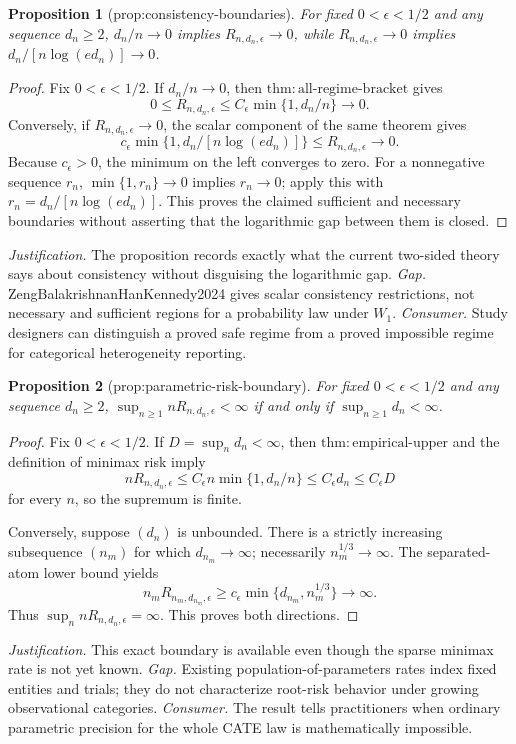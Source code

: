 \documentclass{article}
\newtheorem{proposition}{Proposition}
\begin{document}
\begin{proposition}[prop:consistency-boundaries]\label{prop:consistency-boundaries}
For fixed \(0<\epsilon<1/2\) and any sequence \(d_n\ge2\), \(d_n/n\to0\) implies \(R_{n,d_n,\epsilon}\to0\), while \(R_{n,d_n,\epsilon}\to0\) implies \(d_n/[n\log(ed_n)]\to0\).
\end{proposition}
\begin{proof}
Fix \(0<\epsilon<1/2\).  If \(d_n/n\to0\), then \(\mathrm{thm:all\mbox{-}regime\mbox{-}bracket}\) gives
\[
0\leq R_{n,d_n,\epsilon}\leq C_\epsilon\min\{1,d_n/n\}\longrightarrow0.
\]
Conversely, if \(R_{n,d_n,\epsilon}\to0\), the scalar component of the same theorem gives
\[
c_\epsilon\min\{1,d_n/[n\log(ed_n)]\}
\leq R_{n,d_n,\epsilon}\longrightarrow0.
\]
Because \(c_\epsilon>0\), the minimum on the left converges to zero.  For a nonnegative sequence \(r_n\), \(\min\{1,r_n\}\to0\) implies \(r_n\to0\); apply this with \(r_n=d_n/[n\log(ed_n)]\).  This proves the claimed sufficient and necessary boundaries without asserting that the logarithmic gap between them is closed.
\end{proof}
\par\smallskip\noindent \textit{Justification.} The proposition records exactly what the current two-sided theory says about consistency without disguising the logarithmic gap. \textit{Gap.} ZengBalakrishnanHanKennedy2024 gives scalar consistency restrictions, not necessary and sufficient regions for a probability law under \(W_1\). \textit{Consumer.} Study designers can distinguish a proved safe regime from a proved impossible regime for categorical heterogeneity reporting.

\begin{proposition}[prop:parametric-risk-boundary]\label{prop:parametric-risk-boundary}
For fixed \(0<\epsilon<1/2\) and any sequence \(d_n\ge2\), \(\sup_{n\ge1}nR_{n,d_n,\epsilon}<\infty\) if and only if \(\sup_{n\ge1}d_n<\infty\).
\end{proposition}
\begin{proof}
Fix \(0<\epsilon<1/2\).  If \(D=\sup_nd_n<\infty\), then \(\mathrm{thm:empirical\mbox{-}upper}\) and the definition of minimax risk imply
\[
nR_{n,d_n,\epsilon}\leq C_\epsilon n\min\{1,d_n/n\}
\leq C_\epsilon d_n\leq C_\epsilon D
\]
for every \(n\), so the supremum is finite.

Conversely, suppose \((d_n)\) is unbounded.  There is a strictly increasing subsequence \((n_m)\) for which \(d_{n_m}\to\infty\); necessarily \(n_m^{1/3}\to\infty\).  The separated-atom lower bound yields
\[
n_mR_{n_m,d_{n_m},\epsilon}
\geq c_\epsilon\min\{d_{n_m},n_m^{1/3}\}\longrightarrow\infty.
\]
Thus \(\sup_n nR_{n,d_n,\epsilon}=\infty\).  This proves both directions.
\end{proof}
\par\smallskip\noindent \textit{Justification.} This exact boundary is available even though the sparse minimax rate is not yet known. \textit{Gap.} Existing population-of-parameters rates index fixed entities and trials; they do not characterize root-risk behavior under growing observational categories. \textit{Consumer.} The result tells practitioners when ordinary parametric precision for the whole CATE law is mathematically impossible.
\end{document}
